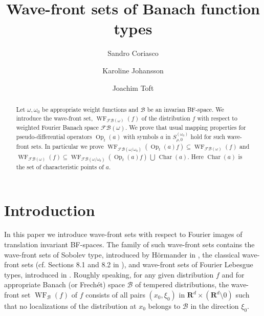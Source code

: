 \documentclass[12pt,a4paper,reqno]{amsart}
\author{Sandro Coriasco}
\author{Karoline Johansson}
\author{Joachim Toft}
\title{Wave-front sets of Banach function types}
\numberwithin{equation}{section}
\numberwithin{thm}{section}
\theoremstyle{definition}
\theoremstyle{remark}
\begin{document}
\begin{abstract}
Let $\omega ,\omega _0$ be appropriate weight functions and $\mathscr B$ be
an invarian BF-space.
We introduce the wave-front set, ${\operatorname{WF}}_{{\mathscr F\! \mathscr B}(\omega )}(f)$ of the distribution $f$
with respect to weighted Fourier Banach space ${\mathscr F\! \mathscr B}(\omega )$. We prove
that usual mapping properties for pseudo-differential operators
${\operatorname{Op}} _t (a)$ with symbols $a$ in $S^{(\omega _0)}_{\rho ,0}$ hold for
such wave-front sets. In particular we prove
$\displaystyle
{\operatorname{WF}} _{{\mathscr F\! \mathscr B}(\omega /\omega _0)}({\operatorname{Op}} _t (a) f)\subseteq {\operatorname{WF}} _{{\mathscr F\! \mathscr B}(\omega
)}(f)$ and ${\operatorname{WF}} _{{\mathscr F\! \mathscr B}(\omega
)}(f)
\subseteq {\operatorname{WF}} _{{\mathscr F\! \mathscr B}(\omega /\omega
_0)}({\operatorname{Op}} _t (a) f){{\textstyle{\, \bigcup \, }}} {\operatorname{Char}} (a)$.
Here ${\operatorname{Char}} (a)$ is the set of characteristic points of $a$.
\end{abstract}

\maketitle

\section{Introduction}\label{sec0}

\par

In this paper we introduce
wave-front sets with respect to Fourier images of translation
invariant BF-spaces. The family of such
wave-front sets contains the wave-front sets of Sobolev type,
introduced by H{\"o}rmander in \cite {Hrm-nonlin}, the
classical wave-front sets (cf. Sections 8.1
and 8.2 in \cite {Ho1}), and wave-front sets of Fourier Lebesgue
types, introduced in \cite{PTT1}. Roughly speaking, for any
given distribution $f$ and for appropriate Banach (or Frech\'et) space
$\mathcal B$ of tempered distributions, the wave-front set
${\operatorname{WF}}  _{\mathcal B}(f)$ of $f$ consists of all pairs
$(x_0,\xi _0)$ in ${\mathbf R^{d}}\times ({\mathbf R^{d}}{\setminus 0})$ such that no
localizations of the distribution at $x_0$ belongs to $\mathcal B$ in
the direction $\xi _0$.

\par
\end{document}
